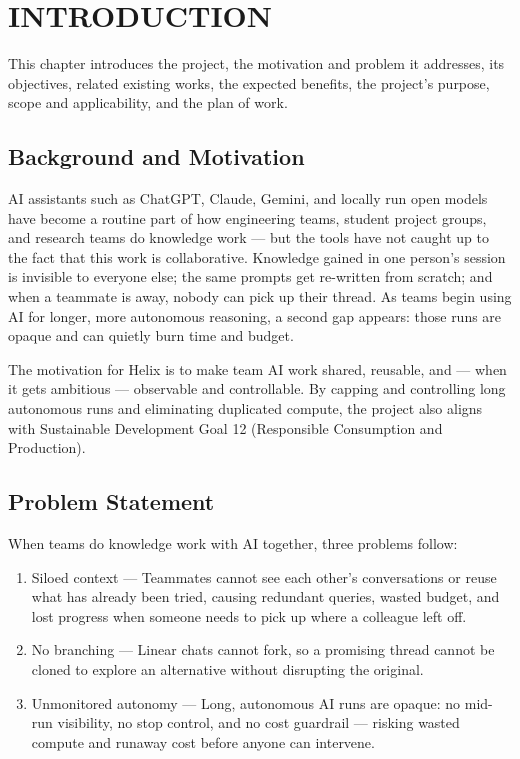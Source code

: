 \documentclass[12pt,a4paper]{report}
\begin{document}
\clearpage
\renewcommand{\contentsname}{\centerline{\normalfont\bfseries\fontsize{16}{19}\selectfont TABLE OF CONTENTS}}
\renewcommand{\listfigurename}{\centerline{\normalfont\bfseries\fontsize{16}{19}\selectfont LIST OF FIGURES}}
\renewcommand{\listtablename}{\centerline{\normalfont\bfseries\fontsize{16}{19}\selectfont LIST OF TABLES}}
\tableofcontents
\clearpage
\listoffigures
\clearpage
\listoftables
\clearpage
{}

\chapter{INTRODUCTION}
This chapter introduces the project, the motivation and problem it addresses, its objectives, related existing works, the expected benefits, the project's purpose, scope and applicability, and the plan of work.

\section{Background and Motivation}
AI assistants such as ChatGPT, Claude, Gemini, and locally run open models have become a routine part of how engineering teams, student project groups, and research teams do knowledge work --- but the tools have not caught up to the fact that this work is collaborative. Knowledge gained in one person's session is invisible to everyone else; the same prompts get re-written from scratch; and when a teammate is away, nobody can pick up their thread. As teams begin using AI for longer, more autonomous reasoning, a second gap appears: those runs are opaque and can quietly burn time and budget.

The motivation for Helix is to make team AI work shared, reusable, and --- when it gets ambitious --- observable and controllable. By capping and controlling long autonomous runs and eliminating duplicated compute, the project also aligns with Sustainable Development Goal 12 (Responsible Consumption and Production).

\section{Problem Statement}
When teams do knowledge work with AI together, three problems follow:

\begin{enumerate}
  \item Siloed context --- Teammates cannot see each other's conversations or reuse what has already been tried, causing redundant queries, wasted budget, and lost progress when someone needs to pick up where a colleague left off.
  \item No branching --- Linear chats cannot fork, so a promising thread cannot be cloned to explore an alternative without disrupting the original.
  \item Unmonitored autonomy --- Long, autonomous AI runs are opaque: no mid-run visibility, no stop control, and no cost guardrail --- risking wasted compute and runaway cost before anyone can intervene.
\end{enumerate}
\end{document}
